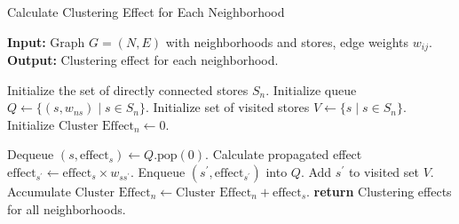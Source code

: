 \documentclass[11pt]{article}
\begin{document}
\begin{algorithm}[H]
  \caption{Calculate Clustering Effect for Each Neighborhood}
  \label{alg:clustering_effect}
  \begin{algorithmic}[1]
    \STATE \textbf{Input:} Graph $G = (N, E)$ with neighborhoods and stores, edge weights $w_{ij}$.
    \STATE \textbf{Output:} Clustering effect for each neighborhood.

      \STATE Initialize the set of directly connected stores $S_n$.
      \STATE Initialize queue $Q \leftarrow \{(s, w_{ns}) \mid s \in S_n\}$.
      \STATE Initialize set of visited stores $V \leftarrow \{s \mid s \in S_n\}$.
      \STATE Initialize $\text{Cluster Effect}_n \leftarrow 0$.

        \STATE Dequeue $(s, \text{effect}_s) \leftarrow Q.\text{pop}(0)$.
          \STATE Calculate propagated effect $\text{effect}_{s^\prime} \leftarrow \text{effect}_s \times w_{ss^\prime}$.
                \STATE Enqueue $(s^\prime, \text{effect}_{s^\prime})$ into $Q$.
                \STATE Add $s^\prime$ to visited set $V$.
            \ENDIF
        \ENDFOR
        \STATE Accumulate $\text{Cluster Effect}_n \leftarrow \text{Cluster Effect}_n + \text{effect}_s$.
      \ENDWHILE
    \ENDFOR
    \STATE \textbf{return} Clustering effects for all neighborhoods.
  \end{algorithmic}
\end{algorithm}
\end{document}
